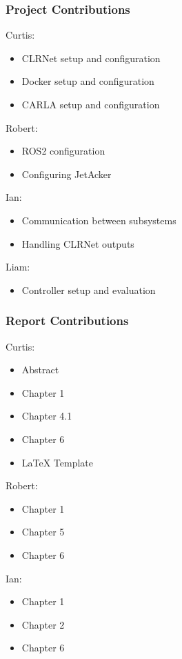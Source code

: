 \documentclass[titlepage]{article}
\begin{document}
\subsubsection{Project Contributions}

Curtis:
\begin{itemize}
	\item CLRNet setup and configuration
	\item Docker setup and configuration
	\item CARLA setup and configuration
\end{itemize}

Robert:
\begin{itemize}
	\item ROS2 configuration
	\item Configuring JetAcker
\end{itemize}

Ian:
\begin{itemize}
	\item Communication between subsystems
	\item Handling CLRNet outputs
\end{itemize}

Liam:
\begin{itemize}
	\item Controller setup and evaluation
\end{itemize}


\subsubsection{Report Contributions}
Curtis:
\begin{itemize}
	\item Abstract
	\item Chapter 1
	\item Chapter 4.1
	\item Chapter 6
	\item LaTeX Template
\end{itemize}

Robert:
\begin{itemize}
	\item Chapter 1
	\item Chapter 5
	\item Chapter 6
\end{itemize}

Ian:
\begin{itemize}
	\item Chapter 1
	\item Chapter 2
	\item Chapter 6
\end{itemize}
\end{document}
